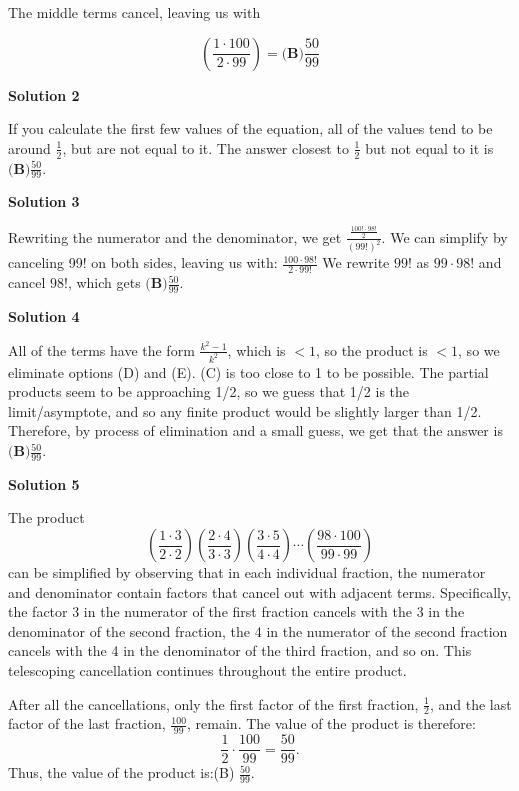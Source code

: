 \begin{enumerate}
 The middle terms cancel, leaving us with

 
 \[\left(\frac{1\cdot100}{2\cdot99}\right)= \boxed{\textbf{(B)}\frac{50}{99}}\]




\textbf{Solution 2}

If you calculate the first few values of the equation, all of the values tend to be around $\frac{1}{2}$, but are not equal to it. The answer closest to $\frac{1}{2}$ but not equal to it is $\boxed{\textbf{(B)}\frac{50}{99}}$.

 



\textbf{Solution 3}

Rewriting the numerator and the denominator, we get $\frac{\frac{100! \cdot 98!}{2}}{\left(99!\right)^2}$. We can simplify by canceling 99! on both sides, leaving us with: $\frac{100 \cdot 98!}{2 \cdot 99!}$ We rewrite $99!$ as $99 \cdot 98!$ and cancel $98!$, which gets $\boxed{\textbf{(B)}\frac{50}{99}}$.

 



\textbf{Solution 4}

All of the terms have the form $\frac{k^2-1}{k^2}$, which is $<1$, so the product is $<1$, so we eliminate options (D) and (E). (C) is too close to 1 to be possible. The partial products seem to be approaching 1/2, so we guess that 1/2 is the limit/asymptote, and so any finite product would be slightly larger than 1/2. Therefore, by process of elimination and a small guess, we get that the answer is $\boxed{\textbf{(B)}\frac{50}{99}}$.

 



\textbf{Solution 5}

The product
 \[\left(\frac{1 \cdot 3}{2 \cdot 2}\right) \left(\frac{2 \cdot 4}{3 \cdot 3}\right) \left(\frac{3 \cdot 5}{4 \cdot 4}\right) \cdots \left(\frac{98 \cdot 100}{99 \cdot 99}\right)\]can be simplified by observing that in each individual fraction, the numerator and denominator contain factors that cancel out with adjacent terms. Specifically, the factor 3 in the numerator of the first fraction cancels with the 3 in the denominator of the second fraction, the 4 in the numerator of the second fraction cancels with the 4 in the denominator of the third fraction, and so on. This telescoping cancellation continues throughout the entire product.

 After all the cancellations, only the first factor of the first fraction, \( \frac{1}{2} \), and the last factor of the last fraction, \( \frac{100}{99} \), remain. The value of the product is therefore:
 \[\frac{1}{2} \cdot \frac{100}{99} = \frac{50}{99}.\]Thus, the value of the product is:(B) \(\frac{50}{99}\).


\end{enumerate}

